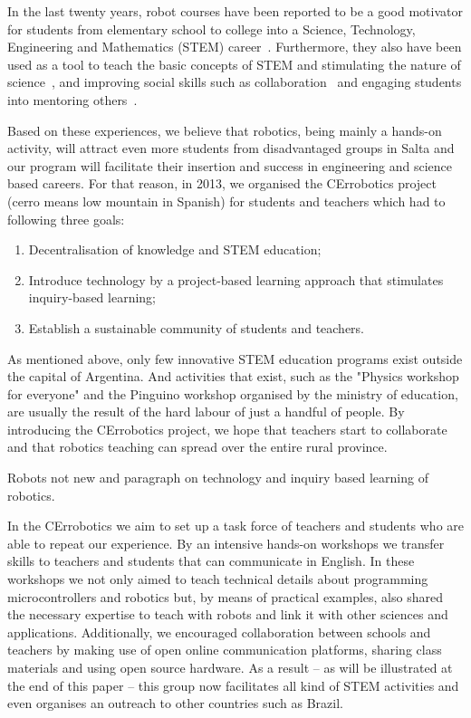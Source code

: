 \documentclass[a4paper]{llncs}
\begin{document}
In the last twenty years, robot courses have been reported to be a good motivator for students from elementary school to college into a Science, Technology, Engineering and Mathematics (STEM) career~\citep{RuizDelSolar2004, Rogers2004, Barak2009, wyffels2010, Nugent2010, wyffels2011, VanDyne2012, Karp2013}.
Furthermore, they also have been used as a tool to teach the basic concepts of STEM and stimulating the nature of science~\citep{Rogers2004, Barak2009, wyffels2010, Nugent2010, wyffels2011, Carbajal2011, VanDyne2012, Karp2013}, and improving social skills such as collaboration~\citep{Barak2009,Nugent2010,wyffels2010,wyffels2011} and engaging students into mentoring others~\citep{Karp2013}.

Based on these experiences, we believe that robotics, being mainly a hands-on activity, will attract even more students from disadvantaged groups in Salta and our program will facilitate their insertion and success in engineering and science based careers.
For that reason, in 2013, we organised the CErrobotics project (cerro means low mountain in Spanish) for students and teachers which had to following three goals:
\begin{enumerate}
	\item Decentralisation of knowledge and STEM education;
	\item Introduce technology by a project-based learning approach that stimulates inquiry-based learning;
	\item Establish a sustainable community of students and teachers.
\end{enumerate}

As mentioned above, only few innovative STEM education programs exist outside the capital of Argentina.
And activities that exist, such as the "Physics workshop for everyone" and the Pinguino workshop organised by the ministry of education, are usually the result of the hard labour of just a handful of people.
By introducing the CErrobotics project, we hope that teachers start to collaborate and that robotics teaching can spread over the entire rural province.

Robots not new and paragraph on technology and inquiry based learning of robotics.

In the CErrobotics we aim to set up a task force of teachers and students who are able to repeat our experience.
By an intensive hands-on workshops we transfer skills to teachers and students that can communicate in English.
In these workshops we not only aimed to teach technical details about programming microcontrollers and robotics but, by means of practical examples, also shared the necessary expertise to teach with robots and link it with other sciences and applications.
Additionally, we encouraged collaboration between schools and teachers by making use of open online communication platforms, sharing class materials and using open source hardware.
As a result -- as will be illustrated at the end of this paper --  this group now facilitates all kind of STEM activities and even organises an outreach to other countries such as Brazil.
\end{document}
